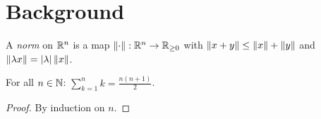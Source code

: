 \chapter{Background}\label{ch:background}

\begin{definition}
A \emph{norm} on $\mathbb{R}^n$ is a map $\left\lVert \cdot \right\rVert:\mathbb{R}^n\to\mathbb{R}_{\ge 0}$ with
$\left\lVert x+y \right\rVert\le\left\lVert x \right\rVert+\left\lVert y \right\rVert$ and $\left\lVert \lambda x \right\rVert=|\lambda|\left\lVert x \right\rVert$.
\end{definition}

\begin{lemma}\label{lem:sum}
For all $n\in\mathbb{N}$: $\sum_{k=1}^{n} k = \frac{n(n+1)}{2}$.
\end{lemma}
\begin{proof}
By induction on $n$.
\end{proof}


